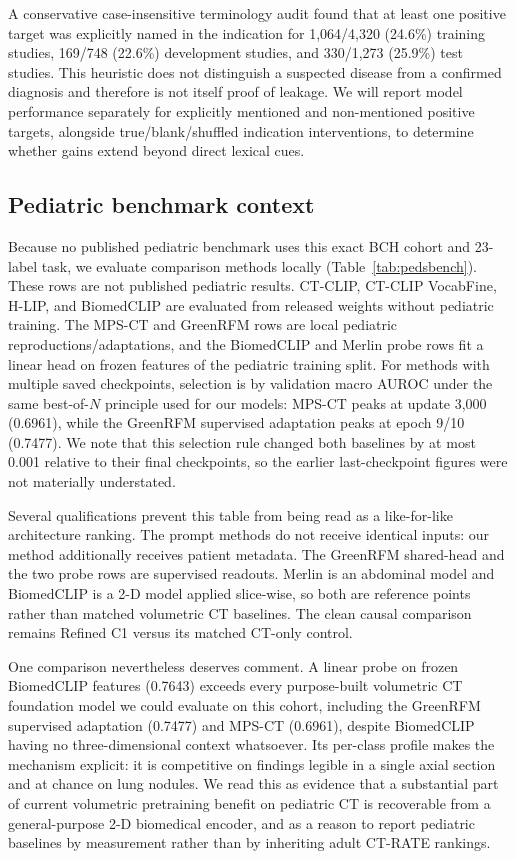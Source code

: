\documentclass[10pt,twocolumn]{article}
\begin{document}
A conservative case-insensitive terminology audit found that at least one
positive target was explicitly named in the indication for 1,064/4,320
(24.6\%) training studies, 169/748 (22.6\%) development studies, and 330/1,273
(25.9\%) test studies. This heuristic does not distinguish a suspected disease
from a confirmed diagnosis and therefore is not itself proof of leakage. We
will report model performance separately for explicitly mentioned and
non-mentioned positive targets, alongside true/blank/shuffled indication
interventions, to determine whether gains extend beyond direct lexical cues.

\subsection{Pediatric benchmark context}
Because no published pediatric benchmark uses this exact BCH cohort and
23-label task, we evaluate comparison methods locally (Table~\ref{tab:pedsbench}).
These rows are not published pediatric results. CT-CLIP, CT-CLIP VocabFine,
H-LIP, and BiomedCLIP are evaluated from released weights without pediatric
training. The MPS-CT and GreenRFM rows are local pediatric
reproductions/adaptations, and the BiomedCLIP and Merlin probe rows fit a
linear head on frozen features of the pediatric training split. For methods
with multiple saved checkpoints, selection is by validation macro AUROC under
the same best-of-$N$ principle used for our models: MPS-CT peaks at update
3,000 (0.6961), while the GreenRFM supervised adaptation peaks at epoch 9/10
(0.7477). We note that this selection rule changed both baselines by at most
0.001 relative to their final checkpoints, so the earlier last-checkpoint
figures were not materially understated.

Several qualifications prevent this table from being read as a like-for-like
architecture ranking. The prompt methods do not receive identical inputs: our
method additionally receives patient metadata. The GreenRFM shared-head and
the two probe rows are supervised readouts. Merlin is an abdominal model and
BiomedCLIP is a 2-D model applied slice-wise, so both are reference points
rather than matched volumetric CT baselines. The clean causal comparison
remains Refined C1 versus its matched CT-only control.

One comparison nevertheless deserves comment. A linear probe on frozen
BiomedCLIP features (0.7643) exceeds every purpose-built volumetric CT
foundation model we could evaluate on this cohort, including the GreenRFM
supervised adaptation (0.7477) and MPS-CT (0.6961), despite BiomedCLIP having
no three-dimensional context whatsoever. Its per-class profile makes the
mechanism explicit: it is competitive on findings legible in a single axial
section and at chance on lung nodules. We read this as evidence that a
substantial part of current volumetric pretraining benefit on pediatric CT is
recoverable from a general-purpose 2-D biomedical encoder, and as a reason to
report pediatric baselines by measurement rather than by inheriting adult
CT-RATE rankings.
\end{document}
